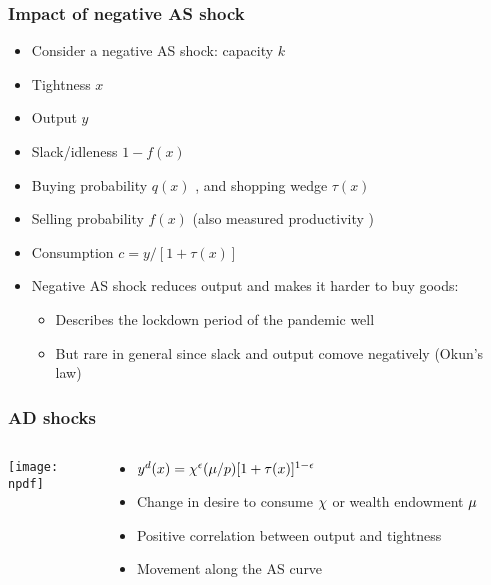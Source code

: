 \documentclass[11pt,aspectratio=169,xcolor={dvipsnames},hyperref={pdftex,pdfpagemode=UseNone,hidelinks,pdfdisplaydoctitle=true},usepdftitle=false]{beamer}
\newcommand{\npdf}{../figures/figures2.pdf}
\begin{document}
\begin{frame}
\frametitle{Impact of negative AS shock}
\begin{itemize}
\item Consider a negative AS shock: capacity $k$ \down
\item Tightness $x$ \up
\item Output $y$ \down
\item Slack/idleness $1-f(x)$ \down
\item Buying probability $q(x)$ \down, and shopping wedge $\tau(x)$ \up
\item Selling probability $f(x)$ \up (also measured productivity \down)
\item Consumption $c = y/[1+\tau(x)]$ \down
\item Negative AS shock reduces output and makes it harder to buy goods:
\begin{itemize}
 \item Describes the lockdown period of the pandemic well
 \item But rare in general since slack and output comove negatively (Okun's law)
 \end{itemize}
\end{itemize}	
\end{frame}


\begin{frame}
\frametitle{AD shocks}
\begin{columns}
\begin{column}{0.6\textwidth}
\texttt{[image: \\npdf]}%
\end{column}
\begin{column}{0.4\textwidth}
\begin{itemize}
	\item $y^d(x) = \chi^{\epsilon}(\mu/p) [1+\tau(x)]^{1-\epsilon}$
	\item Change in desire to consume $\chi$ or wealth endowment $\mu$
	\item Positive correlation between output and tightness
	\item Movement along the AS curve
\end{itemize}
\end{column}
\end{columns} 
\end{frame}
\end{document}
